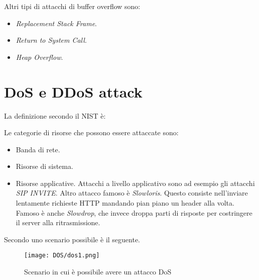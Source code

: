 \documentclass[14pt]{extreport}
\begin{document}
Altri tipi di attacchi di buffer overflow sono:

\begin{itemize}
    \item \textit{Replacement Stack Frame}.
    
    \item \textit{Return to System Call}.
    
    \item \textit{Heap Overflow}.
\end{itemize}

































\chapter{DoS e DDoS attack}\label{dos}
La definizione secondo il NIST è:

\begin{center}
    \textit{}
\end{center}
Le categorie di risorse che possono essere attaccate sono:

\begin{itemize}
    \item Banda di rete.
    
    \item Risorse di sistema.
    
    
    \item Risorse applicative. Attacchi a livello applicativo sono ad esempio gli attacchi \textit{SIP INVITE}. Altro attacco famoso è \textit{Slowloris}. Questo consiste nell'inviare lentamente richieste HTTP mandando pian piano un header alla volta. Famoso è anche \textit{Slowdrop}, che invece droppa parti di risposte per costringere il server alla ritrasmissione.
\end{itemize}
Secondo \cite{stallings} uno scenario possibile è il seguente.
\begin{figure}[H]
    \centering
    \texttt{[image: DOS/dos1.png]}
    \caption{Scenario in cui è possibile avere un attacco DoS}
\end{figure}
\end{document}
